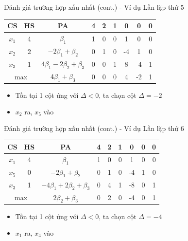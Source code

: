 \documentclass[10pt]{beamer}
\begin{document}
\begin{frame}{Đánh giá trường hợp xấu nhất (cont.) - Ví dụ}
Lần lặp thứ 5
\begin{table}[H]
\centering
\begin{tabular}{|c|c|c|c|c|c|c|c|c|}
\hline
CS & HS & PA & 4 & 2 & 1 & 0 & 0 & 0 \\
\hline
$x_1$ & 4 & $\beta_1$ & 1 & 0 & 0 & 1 & 0 & 0 \\
$x_2$ & 2 & $-2\beta_1 + \beta_2$ & 0 & 1 & 0 & -4 & 1 & 0 \\
$x_3$ & 1 & $4\beta_1 - 2\beta_2 + \beta_3$ & 0 & 0 & 1 & 8 & -4 & 1 \\
\hline
\multicolumn{2}{|c|}{max}
& $4\beta_1 + \beta_3$ & 0 & 0 & 0 & 4 & -2 & 1 \\
\hline
\end{tabular}
\end{table}
\begin{itemize}
\item Tồn tại 1 cột ứng với $\Delta < 0$, ta chọn cột $\Delta = -2$
\item $x_2$ ra, $x_5$ vào
\end{itemize}
\end{frame}

\begin{frame}{Đánh giá trường hợp xấu nhất (cont.) - Ví dụ}
Lần lặp thứ 6
\begin{table}[H]
\centering
\begin{tabular}{|c|c|c|c|c|c|c|c|c|}
\hline
CS & HS & PA & 4 & 2 & 1 & 0 & 0 & 0 \\
\hline
$x_1$ & 4 & $\beta_1$ & 1 & 0 & 0 & 1 & 0 & 0 \\
$x_5$ & 0 & $-2\beta_1 + \beta_2$ & 0 & 1 & 0 & -4 & 1 & 0 \\
$x_3$ & 1 & $-4\beta_1 + 2\beta_2 + \beta_3$ & 0 & 4 & 1 & -8 & 0 & 1 \\
\hline
\multicolumn{2}{|c|}{max}
& $2\beta_2 + \beta_3$ & 0 & 2 & 0 & -4 & 0 & 1 \\
\hline
\end{tabular}
\end{table}
\begin{itemize}
\item Tồn tại 1 cột ứng với $\Delta < 0$, ta chọn cột $\Delta = -4$
\item $x_1$ ra, $x_4$ vào
\end{itemize}
\end{frame}
\end{document}
